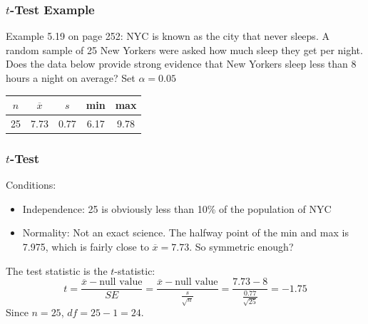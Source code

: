 \documentclass[handout]{beamer}
\newcommand{\blue}[1]{\textcolor{blue2}{#1}}
\newcommand{\xbar}{\overline{x}}
\begin{document}
\begin{frame}
\frametitle{$t$-Test Example}

Example 5.19 on page 252:  NYC is known as the city that never sleeps.  A random sample of 25 New Yorkers were asked how much sleep they get per night. Does the data below provide strong evidence that New Yorkers sleep less than 8 hours a night on average?  Set $\alpha=0.05$

\pause\vspace{0.5cm}
\begin{center}
\begin{tabular}{c|c|c|c|c}
$n$ & $\xbar$ & $s$ & min & max\\
\hline
25 & 7.73 & 0.77 & 6.17 & 9.78\\
\end{tabular}
\end{center}

\end{frame}


\begin{frame}
\frametitle{$t$-Test}
Conditions:
\begin{itemize}
\item \blue{Independence}: 25 is obviously less than 10\% of the population of NYC
\item \blue{Normality}: Not an exact science.  The halfway point of the min and max is 7.975, which is fairly close to $\xbar=7.73$.  So symmetric enough? 
\end{itemize}

\vspace{0.25cm}

The test statistic is the $t$-statistic:
\[
t = \frac{\overline{x}-\mbox{null value}}{SE} = \frac{\overline{x}-\mbox{null value}}{\frac{s}{\sqrt n}} = \frac{7.73 - 8}{\frac{0.77}{\sqrt{25}}} = -1.75
\]
Since $n=25$, $df=25-1=24$.
\end{frame}
\end{document}
